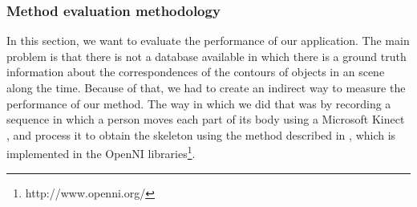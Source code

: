\subsubsection{Method evaluation methodology}\label{ch:chapter02_02_03_01}

In this section, we want to evaluate the performance of our application. The main problem is that there is not a 
database available in which there is a ground truth information about the correspondences of the contours of objects in 
an scene along the time. Because of that, we had to create an indirect way to measure the performance of our method. The 
way in which we did that was by recording a sequence in which a person moves each part of its body using a Microsoft 
Kinect \textregistered, and process it to obtain the skeleton using the method described in \cite{shotton2013real}, 
which is implemented in the OpenNI libraries\footnote{http://www.openni.org/}.

